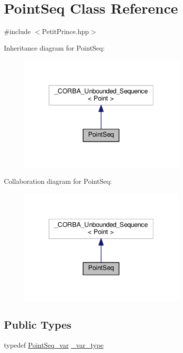 \hypertarget{class_point_seq}{}\section{Point\+Seq Class Reference}
\label{class_point_seq}


{\ttfamily \#include $<$Petit\+Prince.\+hpp$>$}



Inheritance diagram for Point\+Seq\+:
\nopagebreak
\begin{figure}[H]
\begin{center}
\leavevmode
\includegraphics[width=241pt]{class_point_seq__inherit__graph}
\end{center}
\end{figure}


Collaboration diagram for Point\+Seq\+:
\nopagebreak
\begin{figure}[H]
\begin{center}
\leavevmode
\includegraphics[width=241pt]{class_point_seq__coll__graph}
\end{center}
\end{figure}
\subsection*{Public Types}
\begin{DoxyCompactItemize}
\item 
typedef \hyperlink{class_point_seq__var}{Point\+Seq\+\_\+var} \hyperlink{class_point_seq_af8ece0ae1ad9ec5b9b0164b1b31f1b91}{\+\_\+var\+\_\+type}
\end{DoxyCompactItemize}
